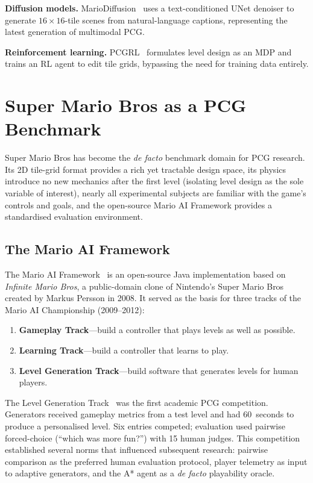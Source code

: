 \documentclass[shortabstract, mgr, english]{iithesis}
\begin{document}
\textbf{Diffusion models.} MarioDiffusion~\citep{schrum2025mariodiffusion} uses a
text-conditioned UNet denoiser to generate $16 \times 16$-tile scenes from
natural-language captions, representing the latest generation of multimodal PCG.

\textbf{Reinforcement learning.} PCGRL~\citep{khalifa2020pcgrl} formulates level
design as an MDP and trains an RL agent to edit tile grids, bypassing the need
for training data entirely.


\section{Super Mario Bros as a PCG Benchmark}
\label{sec:bg-mario}

Super Mario Bros has become the \emph{de facto} benchmark domain for PCG
research. Its 2D tile-grid format provides a rich yet tractable design space, its
physics introduce no new mechanics after the first level (isolating level design
as the sole variable of interest), nearly all experimental subjects are familiar
with the game's controls and goals, and the open-source Mario AI Framework
provides a standardised evaluation environment.

\subsection{The Mario AI Framework}
\label{subsec:bg-mario-framework}

The Mario AI Framework~\citep{karakovskiy2012marioai} is an open-source Java
implementation based on \emph{Infinite Mario Bros}, a public-domain clone of
Nintendo's Super Mario Bros created by Markus Persson in 2008. It served as the
basis for three tracks of the Mario AI Championship (2009--2012):

\begin{enumerate}[nosep]
    \item \textbf{Gameplay Track}---build a controller that plays levels as well
          as possible.
    \item \textbf{Learning Track}---build a controller that learns to play.
    \item \textbf{Level Generation Track}---build software that generates levels
          for human players.
\end{enumerate}

The Level Generation Track~\citep{shaker2011mario} was the first academic PCG
competition. Generators received gameplay metrics from a test level and had
60~seconds to produce a personalised level. Six entries competed; evaluation used
pairwise forced-choice (``which was more fun?'') with 15 human judges. This
competition established several norms that influenced subsequent research:
pairwise comparison as the preferred human evaluation protocol, player telemetry
as input to adaptive generators, and the A* agent as a \emph{de facto}
playability oracle.
\end{document}
